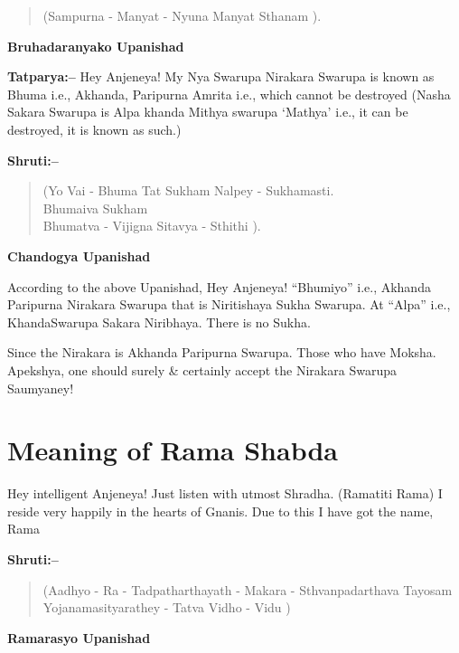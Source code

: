 \begin{verse}
(Sampurna - Manyat - Nyuna Manyat Sthanam ).
\end{verse}

\begin{flushright}
\textbf{Bruhadaranyako Upanishad}
\end{flushright}

\textbf{Tatparya:–} Hey Anjeneya! My Nya Swarupa Nirakara Swarupa is known as Bhuma i.e., Akhanda, Paripurna Amrita i.e., which cannot be destroyed (Nasha Sakara Swarupa is Alpa khanda Mithya swarupa ‘Mathya’ i.e., it can be destroyed, it is known as such.)

\textbf{Shruti:–}

\begin{verse}
(Yo Vai - Bhuma Tat Sukham Nalpey - Sukhamasti. \\ Bhumaiva Sukham \\ Bhumatva - Vijigna Sitavya - Sthithi ).
\end{verse}

\begin{flushright}
\textbf{Chandogya Upanishad}
\end{flushright}

According to the above Upanishad, Hey Anjeneya! “Bhumiyo” i.e., Akhanda Paripurna Nirakara Swarupa that is Niritishaya Sukha Swarupa. At “Alpa” i.e., KhandaSwarupa Sakara Niribhaya. There is no Sukha.

Since the Nirakara is Akhanda Paripurna Swarupa. Those who have Moksha. Apekshya, one should surely \& certainly accept the Nirakara Swarupa Saumyaney!

\chapter{Meaning of Rama Shabda}

Hey intelligent Anjeneya! Just listen with utmost Shradha. (Ramatiti Rama) I reside very happily in the hearts of Gnanis. Due to this I have got the name, Rama

\textbf{Shruti:–}

\begin{verse}
(Aadhyo - Ra - Tadpatharthayath - Makara - Sthvan\break padarthava  Tayosam Yojanamasityarathey - Tatva Vidho - Vidu )
\end{verse}

\begin{flushright}
\textbf{Ramarasyo Upanishad}
\end{flushright}

